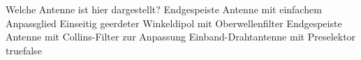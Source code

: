     {Welche Antenne ist hier dargestellt?}
    {Endgespeiste Antenne mit einfachem Anpassglied}
    {Einseitig geerdeter Winkeldipol mit Oberwellenfilter}
    {Endgespeiste Antenne mit Collins-Filter zur Anpassung}
    {Einband-Drahtantenne mit Preselektor}
    {true}{false}